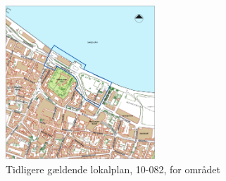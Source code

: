 \begin{figure}[htbp]
	\centering
	\includegraphics[width=0.5\textwidth]{billeder/lokalplanoversigt.png}
	\caption{Tidligere gældende lokalplan, 10-082, for området}
	\label{fig:10-082}
\end{figure}

